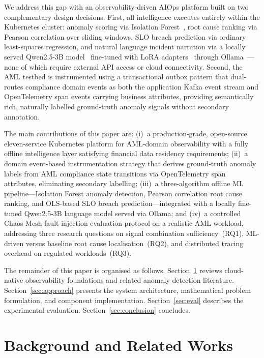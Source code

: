 \documentclass[a4paper,anonymous,UKenglish]{lipics-v2021}
\begin{document}
We address this gap with an observability-driven AIOps platform built on two
complementary design decisions. First, all intelligence executes entirely
within the Kubernetes cluster: anomaly scoring via Isolation
Forest~\cite{liu2012isolation}, root cause ranking via Pearson correlation over
sliding windows, SLO breach prediction via ordinary least-squares regression,
and natural language incident narration via a locally served Qwen2.5-3B
model~\cite{qwen2024} fine-tuned with LoRA adapters~\cite{hu2022lora} through
Ollama~\cite{ollama2023}---none of which require external API access or cloud
connectivity. Second, the AML testbed is instrumented using a transactional
outbox pattern that dual-routes compliance domain events as both the application
Kafka event stream and OpenTelemetry span events carrying business attributes,
providing semantically rich, naturally labelled ground-truth anomaly signals
without secondary annotation.

The main contributions of this paper are: (i)~a production-grade, open-source
eleven-service Kubernetes platform for AML-domain observability with a fully
offline intelligence layer satisfying financial data residency requirements;
(ii)~a domain event-based instrumentation strategy that derives ground-truth
anomaly labels from AML compliance state transitions via OpenTelemetry span
attributes, eliminating secondary labelling; (iii)~a three-algorithm offline ML
pipeline---Isolation Forest anomaly detection, Pearson correlation root cause
ranking, and OLS-based SLO breach prediction---integrated with a locally
fine-tuned Qwen2.5-3B language model served via Ollama; and (iv)~a controlled
Chaos Mesh fault injection evaluation protocol on a realistic AML workload,
addressing three research questions on signal combination
sufficiency~(RQ1), ML-driven versus baseline root cause
localisation~(RQ2), and distributed tracing overhead on regulated
workloads~(RQ3).

The remainder of this paper is organised as follows.
Section~\ref{sec:background} reviews cloud-native observability foundations
and related anomaly detection literature. Section~\ref{sec:approach} presents
the system architecture, mathematical problem formulation, and component
implementation. Section~\ref{sec:eval} describes the experimental evaluation.
Section~\ref{sec:conclusion} concludes.

\section{Background and Related Works}
\label{sec:background}
\end{document}
